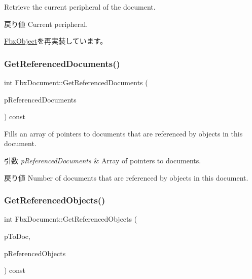 Retrieve the current peripheral of the document. \begin{DoxyReturn}{戻り値}
Current peripheral. 
\end{DoxyReturn}


\hyperlink{class_fbx_object_a7aef9083f559702547871bedbf0d6b5a}{Fbx\+Object}を再実装しています。

\mbox{\label{class_fbx_document_a2aa5ab43264511b4f995aeec92e618fb}} 
\subsubsection{\texorpdfstring{Get\+Referenced\+Documents()}{GetReferencedDocuments()}}
{\footnotesize\ttfamily int Fbx\+Document\+::\+Get\+Referenced\+Documents (\begin{DoxyParamCaption}\item[{\hyperlink{class_fbx_array}{Fbx\+Array}$<$ \hyperlink{class_fbx_document}{Fbx\+Document} $\ast$$>$ \&}]{p\+Referenced\+Documents }\end{DoxyParamCaption}) const}

Fills an array of pointers to documents that are referenced by objects in this document.


\begin{DoxyParams}{引数}
{\em p\+Referenced\+Documents} & Array of pointers to documents. \\
\hline
\end{DoxyParams}
\begin{DoxyReturn}{戻り値}
Number of documents that are referenced by objects in this document. 
\end{DoxyReturn}
\mbox{\label{class_fbx_document_ab515ccdc174d34182eb04cfbd65709ee}} 
\subsubsection{\texorpdfstring{Get\+Referenced\+Objects()}{GetReferencedObjects()}}
{\footnotesize\ttfamily int Fbx\+Document\+::\+Get\+Referenced\+Objects (\begin{DoxyParamCaption}\item[{const \hyperlink{class_fbx_document}{Fbx\+Document} $\ast$}]{p\+To\+Doc,  }\item[{\hyperlink{class_fbx_array}{Fbx\+Array}$<$ \hyperlink{class_fbx_object}{Fbx\+Object} $\ast$$>$ \&}]{p\+Referenced\+Objects }\end{DoxyParamCaption}) const}

